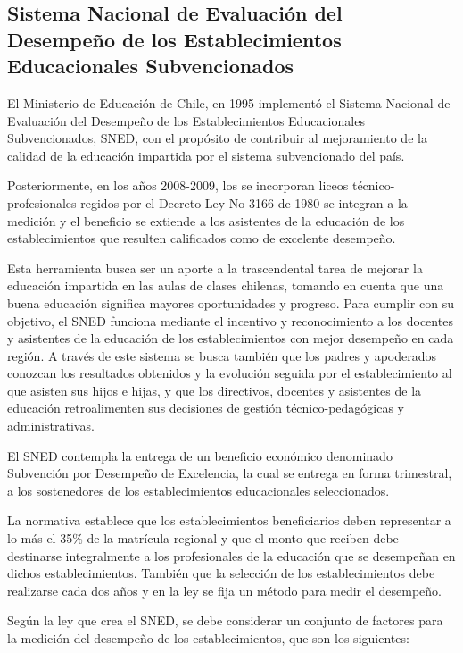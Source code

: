 \subsection{Sistema Nacional de Evaluación del Desempeño de los Establecimientos Educacionales Subvencionados}

El Ministerio de Educación de Chile, en 1995 implementó el Sistema Nacional de Evaluación del Desempeño de los Establecimientos Educacionales Subvencionados, SNED, con el propósito de contribuir al mejoramiento de la calidad de la educación impartida por el sistema subvencionado del país.

Posteriormente, en los años 2008-2009, los se incorporan liceos técnico-profesionales regidos por el Decreto Ley No 3166 de 1980 se integran a la medición y el beneficio se extiende a los asistentes de la educación de los establecimientos que resulten calificados como de excelente desempeño.

Esta herramienta busca ser un aporte a la trascendental tarea de mejorar la educación impartida en las aulas de clases chilenas, tomando en cuenta que una buena educación significa mayores oportunidades y progreso. Para cumplir con su objetivo, el SNED funciona mediante el incentivo y reconocimiento a los docentes y asistentes de la educación de los establecimientos con mejor desempeño en cada región. A través de este sistema se busca también que los padres y apoderados conozcan los resultados obtenidos y la evolución seguida por el establecimiento al que asisten sus hijos e hijas, y que los directivos, docentes y asistentes de la educación retroalimenten sus decisiones de gestión técnico-pedagógicas y administrativas.

El SNED contempla la entrega de un beneficio económico denominado Subvención por Desempeño de Excelencia, la cual se entrega en forma trimestral, a los sostenedores de los establecimientos educacionales seleccionados.

La normativa establece que los establecimientos beneficiarios deben representar a lo más el 35\% de la matrícula regional y que el monto que reciben debe destinarse integralmente a los profesionales de la educación que se desempeñan en dichos establecimientos. También que la selección de los establecimientos debe realizarse cada dos años y en la ley se fija un método para medir el desempeño.

Según la ley que crea el SNED, se debe considerar un conjunto de factores para la medición del desempeño de los establecimientos, que son los siguientes:

